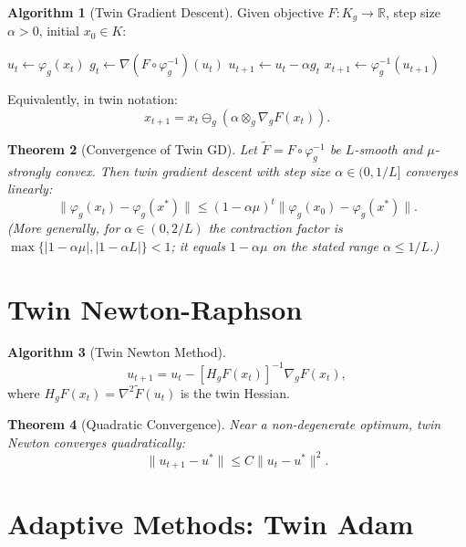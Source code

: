 \documentclass[11pt,twoside]{book}
\theoremstyle{plain}
\newtheorem{theorem}{Theorem}[chapter]
\theoremstyle{definition}
\newtheorem{algorithm_def}[theorem]{Algorithm}
\theoremstyle{remark}
\newcommand{\R}{\mathbb{R}}
\newcommand{\tminus}{\ominus_g}
\newcommand{\ttimes}{\otimes_g}
\newcommand{\Kg}{K_g}
\newcommand{\nablg}{\nabla_g}
\begin{document}
\begin{algorithm_def}[Twin Gradient Descent]
    \label{alg:twin_gd}
    Given objective $F : \Kg \to \R$, step size $\alpha > 0$, initial $x_0 \in K$:
    \begin{algorithmic}[1]
            \State $u_t \gets \varphi_g(x_t)$ 
            \State $g_t \gets \nabla(F \circ \varphi_g^{-1})(u_t)$ 
            \State $u_{t+1} \gets u_t - \alpha g_t$ 
            \State $x_{t+1} \gets \varphi_g^{-1}(u_{t+1})$ \Comment{Map back to $\Kg$}
        \EndFor
    \end{algorithmic}
    
    Equivalently, in twin notation:
    \[
    x_{t+1} = x_t \tminus (\alpha \ttimes \nablg F(x_t)).
    \]
\end{algorithm_def}

\begin{theorem}[Convergence of Twin GD]
    \label{thm:twin_gd_convergence}
    Let $\tilde{F} = F \circ \varphi_g^{-1}$ be $L$-smooth and $\mu$-strongly convex. Then twin gradient descent with step size $\alpha \in (0, 1/L]$ converges linearly:
    \[
    \|\varphi_g(x_t) - \varphi_g(x^*)\| \leq (1 - \alpha\mu)^t \|\varphi_g(x_0) - \varphi_g(x^*)\|.
    \]
    (More generally, for $\alpha \in (0, 2/L)$ the contraction factor is
    $\max\{|1-\alpha\mu|, |1-\alpha L|\} < 1$; it equals $1-\alpha\mu$ on the
    stated range $\alpha \leq 1/L$.)
\end{theorem}

\section{Twin Newton-Raphson}
\label{sec:twin_newton}

\begin{algorithm_def}[Twin Newton Method]
    \[
    u_{t+1} = u_t - [H_g F(x_t)]^{-1} \nablg F(x_t),
    \]
    where $H_g F(x_t) = \nabla^2 \tilde{F}(u_t)$ is the twin Hessian.
\end{algorithm_def}

\begin{theorem}[Quadratic Convergence]
    Near a non-degenerate optimum, twin Newton converges quadratically:
    \[
    \|u_{t+1} - u^*\| \leq C \|u_t - u^*\|^2.
    \]
\end{theorem}

\section{Adaptive Methods: Twin Adam}
\label{sec:twin_adam}
\end{document}
